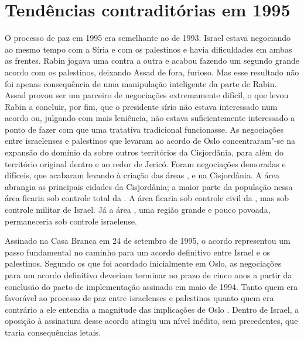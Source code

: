 \section{Tendências contraditórias em 1995}

O processo de paz em 1995 era semelhante ao de 1993. Israel estava
negociando ao mesmo tempo com a Síria e com os palestinos e havia
dificuldades em ambas as frentes. Rabin jogava uma contra a outra e
acabou fazendo um segundo grande acordo com os palestinos, deixando Assad
de fora, furioso. Mas esse resultado não foi apenas consequência de uma
manipulação inteligente da parte de Rabin. Assad provou ser um parceiro
de negociações extremamente difícil, o que levou Rabin a concluir, por
fim, que o presidente sírio não estava interessado num acordo ou,
julgando com mais leniência, não estava suficientemente interessado a
ponto de fazer com que uma tratativa tradicional funcionasse. As
negociações entre israelenses e palestinos que levaram ao acordo de Oslo
 concentraram"-se na expansão do domínio da  sobre outros territórios
da Cisjordânia, para além do território original dentro e ao redor de
Jericó. Foram negociações demoradas e difíceis, que acabaram levando à
criação das áreas ,  e 
na Cisjordânia. A área  abrangia as
principais cidades da Cisjordânia; a maior parte da população nessa área
ficaria sob controle total da . A área  ficaria sob controle civil da
, mas sob controle militar de Israel. Já a área , uma região grande e
pouco povoada, permaneceria sob controle israelense.

Assinado na Casa Branca em 24 de setembro de 1995, o acordo representou
um passo fundamental no caminho para um acordo definitivo entre Israel e
os palestinos. Segundo os que foi acordado inicialmente em Oslo, as negociações para
um acordo definitivo deveriam terminar no prazo de cinco anos a partir
da conclusão do pacto de implementação assinado em maio de 1994. Tanto
quem era favorável ao processo de paz entre israelenses e palestinos
quanto quem era contrário a ele entendia a magnitude das implicações de
Oslo . Dentro de Israel, a oposição à assinatura desse acordo atingiu
um nível inédito, sem precedentes, que traria consequências letais.

